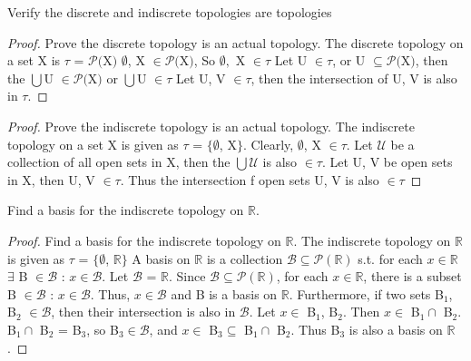 \documentclass{article}
\begin{document}
	\begin{proposition}
	Verify the discrete and indiscrete topologies are topologies
	\end{proposition}
	\begin{proof} Prove the discrete topology is an actual topology.
	\newline\newline
	The discrete topology on a set X is $\tau$ = $\mathcal{P}($X$)$
	\newline
	$\emptyset$, X $\in \mathcal{P}($X$)$, So $\emptyset,$ X $\in \tau$
	\newline
	Let U $\in \tau$, or U $\subseteq \mathcal{P}($X$)$, then the $\bigcup$U $\in \mathcal{P}($X$)$ or $\bigcup$U $\in \tau$
	\newline
	Let U, V $\in \tau$, then the intersection of U, V is also in $\tau$.
	\end{proof}
	\begin{proof} Prove the indiscrete topology is an actual topology.
	\newline\newline
	The indiscrete topology on a set X is given as $\tau$ = $\lbrace \emptyset$, X$\rbrace$.
	\newline
	Clearly, $\emptyset$, X $\in \tau$.
	\newline
	Let $\mathcal{U}$ be a collection of all open sets in X, then the $\bigcup \mathcal{U}$ is also $\in \tau$.
	\newline
	Let U, V be open sets in X, then U, V $\in \tau$.
	\newline
	Thus the intersection f open sets U, V is also $\in \tau$
	\end{proof}
	\begin{proposition}
	Find a basis for the indiscrete topology on $\mathbb{R}$.
	\end{proposition}	
	\begin{proof}
	Find a basis for the indiscrete topology on $\mathbb{R}$.
	\newline\newline
	The indiscrete topology on $\mathbb{R}$ is given as $\tau$ = $\lbrace \emptyset$, $\mathbb{R}\rbrace$
	\newline
	A basis on $\mathbb{R}$ is a collection $\mathcal{B} \subseteq \mathcal{P}(\mathbb{R})$ s.t. for each $x \in \mathbb{R}$ $\exists$ B $\in \mathcal{B}$ : $x \in \mathcal{B}$.
	\newline
	Let $\mathcal{B}$ = $\mathbb{R}$. Since $\mathcal{B} \subseteq \mathcal{P}(\mathbb{R})$, for each $x \in \mathbb{R}$, there is a subset B $\in \mathcal{B}$ : $x \in \mathcal{B}$.
	\newline
	Thus, $x \in \mathcal{B}$ and B is a basis on $\mathbb{R}$.
	\newline
	Furthermore, if two sets B$_1$, B$_2$ $\in \mathcal{B}$, then their intersection is also in $\mathcal{B}$. Let $x \in$ B$_1$, B$_2$. Then $x \in$ B$_1 \cap$ B$_2$.
	\newline
	B$_1 \cap$ B$_2$ = B$_3$, so B$_3 \in \mathcal{B}$, and $x \in$ B$_3 \subseteq$ B$_1 \cap$ B$_2$.
	\newline
	Thus B$_3$ is also a basis on $\mathbb{R}$.
	\end{proof}
	
\end{document}
